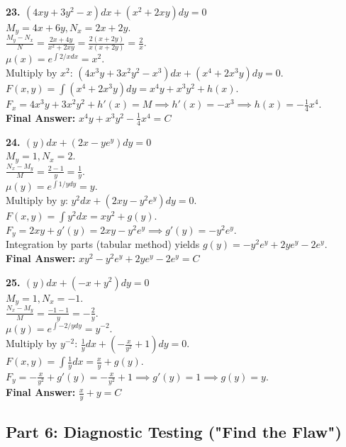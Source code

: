 \documentclass[11pt]{article}
\begin{document}
\textbf{23. $(4xy + 3y^2 - x)dx + (x^2 + 2xy)dy = 0$} \\
$M_y = 4x + 6y, N_x = 2x + 2y$. \\
$\frac{M_y - N_x}{N} = \frac{2x + 4y}{x^2 + 2xy} = \frac{2(x + 2y)}{x(x + 2y)} = \frac{2}{x}$. \\
$\mu(x) = e^{\int 2/x dx} = x^2$. \\
Multiply by $x^2$: $(4x^3 y + 3x^2 y^2 - x^3)dx + (x^4 + 2x^3 y)dy = 0$. \\
$F(x,y) = \int (x^4 + 2x^3 y)dy = x^4 y + x^3 y^2 + h(x)$. \\
$F_x = 4x^3 y + 3x^2 y^2 + h'(x) = M \implies h'(x) = -x^3 \implies h(x) = -\frac{1}{4}x^4$. \\
\textbf{Final Answer:} $x^4 y + x^3 y^2 - \frac{1}{4}x^4 = C$

\textbf{24. $(y)dx + (2x - y e^y)dy = 0$} \\
$M_y = 1, N_x = 2$. \\
$\frac{N_x - M_y}{M} = \frac{2 - 1}{y} = \frac{1}{y}$. \\
$\mu(y) = e^{\int 1/y dy} = y$. \\
Multiply by $y$: $y^2 dx + (2xy - y^2 e^y)dy = 0$. \\
$F(x,y) = \int y^2 dx = x y^2 + g(y)$. \\
$F_y = 2xy + g'(y) = 2xy - y^2 e^y \implies g'(y) = -y^2 e^y$. \\
Integration by parts (tabular method) yields $g(y) = -y^2 e^y + 2y e^y - 2e^y$. \\
\textbf{Final Answer:} $xy^2 - y^2 e^y + 2y e^y - 2e^y = C$

\textbf{25. $(y)dx + (-x + y^2)dy = 0$} \\
$M_y = 1, N_x = -1$. \\
$\frac{N_x - M_y}{M} = \frac{-1 - 1}{y} = -\frac{2}{y}$. \\
$\mu(y) = e^{\int -2/y dy} = y^{-2}$. \\
Multiply by $y^{-2}$: $\frac{1}{y} dx + (-\frac{x}{y^2} + 1)dy = 0$. \\
$F(x,y) = \int \frac{1}{y} dx = \frac{x}{y} + g(y)$. \\
$F_y = -\frac{x}{y^2} + g'(y) = -\frac{x}{y^2} + 1 \implies g'(y) = 1 \implies g(y) = y$. \\
\textbf{Final Answer:} $\frac{x}{y} + y = C$

\subsection*{Part 6: Diagnostic Testing ("Find the Flaw")}
\end{document}
